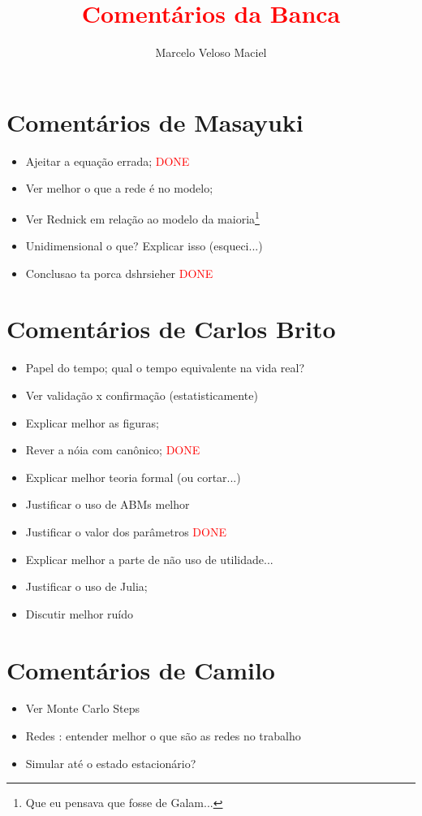 \documentclass{article}
\title{\textcolor{red}{Comentários da Banca}}
\author{Marcelo Veloso Maciel } \date{}
\begin{document}
\pagecolor{base03}
\color{base1}
\maketitle


\section*{Comentários de Masayuki}
\begin{itemize}
\item Ajeitar a equação errada;  \textcolor{red}{DONE}
\item Ver melhor o que a rede é no modelo;
\item Ver Rednick em relação ao modelo da maioria\footnote{Que eu pensava que
    fosse de Galam...}
\item Unidimensional o que? Explicar isso (esqueci...)
\item Conclusao ta porca dshrsieher \textcolor{red}{DONE}
\end{itemize}

\section*{Comentários de Carlos Brito}
\begin{itemize}
\item Papel do tempo; qual o tempo equivalente na vida real?
\item Ver validação x confirmação (estatisticamente)
\item Explicar melhor as figuras;
\item Rever a nóia com canônico; \textcolor{red}{DONE}
\item Explicar melhor teoria formal (ou cortar...)
\item Justificar o uso de ABMs melhor
\item Justificar o valor dos parâmetros  \textcolor{red}{DONE}
\item Explicar melhor a parte de não uso de utilidade...
\item Justificar o uso de Julia;
\item Discutir melhor ruído
\end{itemize}


\section*{Comentários de Camilo}
\begin{itemize}
\item Ver Monte Carlo Steps
\item Redes : entender melhor o que são as redes no trabalho
\item Simular até o estado estacionário?
\end{itemize}
\end{document}
